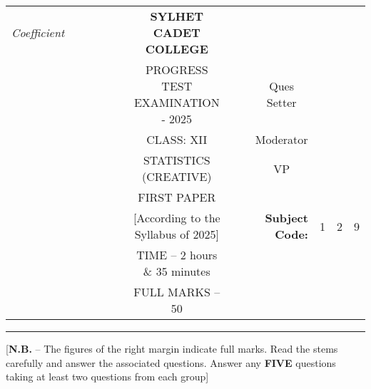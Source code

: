 \documentclass[12pt]{article}
\newcommand{\DisableFootNotes}{%
  \renewcommand{\footnote}[2][]{\relax}
}
\begin{document}
\begin{table}[]
\begin{tabular}{llllllcllrlll}
\textit{Coefficient} &  &  &  &  &  & \textbf{SYLHET CADET COLLEGE}       &  &                       & \multicolumn{1}{l}{}                        &                        &                        &                        \\ \cline{10-13} 
                 &  &  &  &  &  & PROGRESS TEST EXAMINATION - 2025             &  & \multicolumn{1}{l|}{} & \multicolumn{1}{c|}{Ques Setter}            & \multicolumn{3}{l|}{}                                                    \\ \cline{10-13} 
                 &  &  &  &  &  & CLASS: XII                          &  & \multicolumn{1}{l|}{} & \multicolumn{1}{c|}{Moderator}              & \multicolumn{3}{l|}{}                                                    \\ \cline{10-13} 
                 &  &  &  &  &  & STATISTICS (CREATIVE)               &  & \multicolumn{1}{l|}{} & \multicolumn{1}{c|}{VP}                     & \multicolumn{3}{l|}{}                                                    \\ \cline{10-13} 
                 &  &  &  &  &  & FIRST PAPER                        &  &                       &                                             &                        &                        &                        \\ \cline{11-13} 
                 &  &  &  &  &  & [According to the Syllabus of 2025] &  &                       & \multicolumn{1}{r|}{\textbf{Subject Code:}} & \multicolumn{1}{l|}{1} & \multicolumn{1}{l|}{2} & \multicolumn{1}{l|}{9} \\ \cline{11-13} 
                 &  &  &  &  &  & TIME – 2 hours \& 35 minutes        &  &                       &                                             &                        &                        &                        \\
                 &  &  &  &  &  & FULL MARKS – 50                     &  &                       & \textbf{}                                   &                        &                        &                       
\end{tabular}
\end{table}

\hrule

\DisableFootNotes

\begin{center}
[\textbf{N.B.} – The figures of the right margin indicate full marks. Read the stems carefully and answer the associated questions. Answer any \textbf{FIVE} questions taking at least two questions from each group]\\
\end{center}
\end{document}
